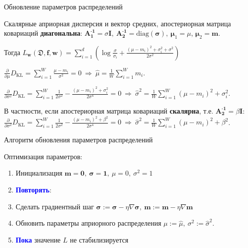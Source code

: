 \documentclass{beamer}
\newcommand{\DD}{{\mathfrak{D}}}
\newcommand{\bw}{{\textbf{w}}}
\newcommand{\II}{{\textbf{I}}}
\newcommand{\bbf}{{\textbf{f}}}
\newcommand{\bm}{{\textbf{m}}}
\newcommand{\bs}{{\boldsymbol{\sigma}}}
\newcommand{\bAo}{\mathbf{A^\text{-1}_\text{1}}}
\newcommand{\bAt}{\mathbf{A^\text{-1}_\text{2}}}
\newcommand{\bmuo}{{\boldsymbol{\mu}_1}}
\newcommand{\bmut}{{\boldsymbol{\mu}_2}}
\newcommand{\DKL}{\mathit{D}_{\text{KL}}}
\begin{document}
\begin{frame}{Обновление параметров распределений}

Скалярные априорная дисперсия и вектор средних, апостериорная матрица ковариаций \textbf{диагональна}: $\bAo = \sigma\II, \ \bAt = \text{diag}(\bs), \ \bmuo = \mu$, $\bmut = \bm$.

Тогда $L_\bw(\DD,\bbf,\bw) = \sum\limits_{i=1}^d(\log\frac{\sigma}{\sigma_i} + \frac{(\mu-m_i)^2 + \sigma_i^2 + \sigma^2}{2\sigma^2})$

$\frac\partial{\partial\mu}\DKL = \sum\limits_{i=1}^W\frac{\mu-m_i}{\sigma^2}=0 \ \Rightarrow \ \hat{\mu} = \frac1W\sum\limits_{i=1}^W m_i$.

$\frac\partial{\partial\sigma^2}\DKL = \sum\limits_{i=1}^W \frac1{2\sigma^2}-\frac{(\mu-m_i)^2 + \sigma_i^2}{2\sigma^4}=0 \ \Rightarrow \ \hat{\sigma}^2 = \frac1W\sum\limits_{i=1}^W (\mu-m_i)^2 + \sigma_i^2$.

\begin{block}{}
В частности, если апостериорная матрица ковариаций \textbf{скалярна}, т.е. $\bAt = \beta \II$:
$\frac\partial{\partial\sigma^2}\DKL = \sum\limits_{i=1}^W \frac1{2\sigma^2}-\frac{(\mu-m_i)^2 + \beta^2}{2\sigma^4}=0 \ \Rightarrow \ \hat{\sigma}^2 = \frac1W\sum\limits_{i=1}^W (\mu-m_i)^2 + \beta^2$.
\end{block}


\end{frame}

\begin{frame}{Алгоритм обновления параметров распределений}

Оптимизация параметров:

\begin{enumerate}
	\item Инициализация $\bm = \textbf{0}, \ \bs = \textbf{1}, \ \mu = 0, \ \sigma^2 = 1$
	
	\item \textcolor{blue}{\textbf{Повторять}}:
	
	\item Сделать градиентный шаг $\bs:=\bs-\eta\nabla\bs, \ \bm:=\bm-\eta\nabla\bm$
	
	\item Обновить параметры априорного распределения $\mu:= \hat{\mu}, \ \sigma^2:=\hat{\sigma}^2$.
	
	\item \textcolor{blue}{\textbf{Пока}} значение $L$ не стабилизируется
	

\end{enumerate}

\end{frame}
\end{document}
